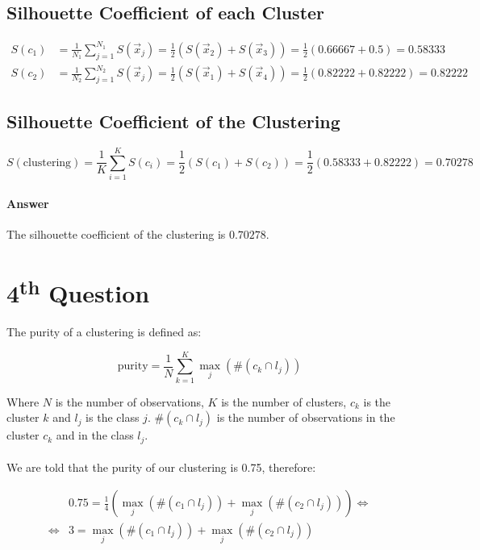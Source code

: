 \documentclass{article}
\begin{document}
\subsection*{Silhouette Coefficient of each Cluster}

\begin{align*}
  S(c_1) &= \frac{1}{N_1} \sum_{j=1}^{N_1} S(\vec{x}_j) = \frac{1}{2} ( S(\vec{x}_2) + S(\vec{x}_3) ) = \frac{1}{2} ( 0.66667 + 0.5 ) = 0.58333 \\
  S(c_2) &= \frac{1}{N_2} \sum_{j=1}^{N_2} S(\vec{x}_j) = \frac{1}{2} ( S(\vec{x}_1) + S(\vec{x}_4) ) = \frac{1}{2} ( 0.82222 + 0.82222 ) = 0.82222
\end{align*}

\subsection*{Silhouette Coefficient of the Clustering}

\[ S(\text{clustering}) = \frac{1}{K} \sum_{i=1}^K S(c_i) = \frac{1}{2} ( S(c_1) + S(c_2) ) = \frac{1}{2} ( 0.58333 + 0.82222 ) = 0.70278 \]

\paragraph{Answer} The silhouette coefficient of the clustering is $0.70278$.

\newpage

\section*{4\textsuperscript{th} Question}

The purity of a clustering is defined as:

\[ \text{purity} = \frac{1}{N} \sum_{k=1}^K \max_j (\#(c_k \cap l_j)) \]

Where $N$ is the number of observations, $K$ is the number of clusters, $c_k$ is the cluster $k$ and $l_j$ is the class $j$.
$\#(c_k \cap l_j)$ is the number of observations in the cluster $c_k$ and in the class $l_j$.
\paragraph{}

We are told that the purity of our clustering is 0.75, therefore:

\begin{align*}
  &0.75 = \frac{1}{4} ( \max_j (\#(c_1 \cap l_j)) + \max_j (\#(c_2 \cap l_j)) ) \Leftrightarrow \\
  \Leftrightarrow &3 = \max_j (\#(c_1 \cap l_j)) + \max_j (\#(c_2 \cap l_j))
\end{align*}
\end{document}

